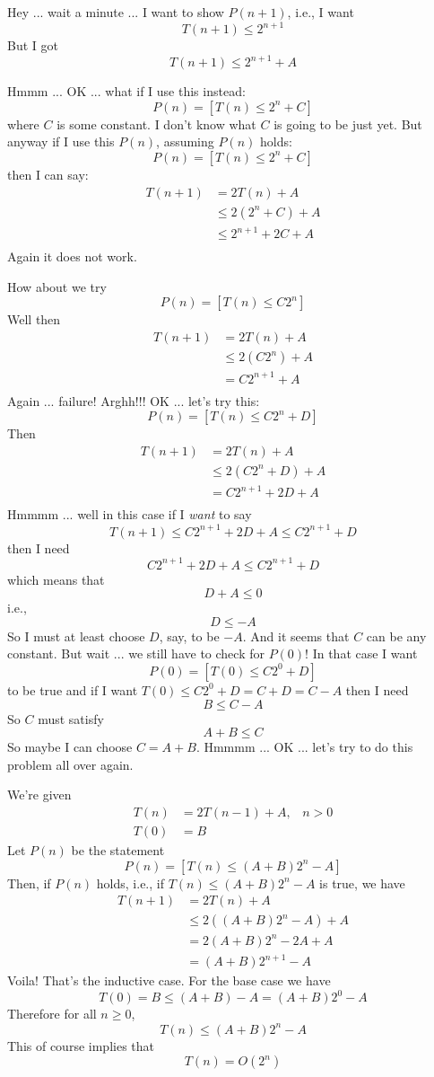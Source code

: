 Hey ... wait a minute ...
I want to show $P(n+1)$, i.e., I want
\[
T(n+1) \leq 2^{n+1}
\]
But I got
\[
T(n+1) \leq 2^{n+1} + A
\]

Hmmm ... OK ... what if I use this instead:
\[
P(n) = [T(n) \leq 2^n + C]
\]
where $C$ is some constant.
I don't know what $C$ is going to be just yet.
But anyway if I use this $P(n)$,
assuming $P(n)$ holds:
\[
P(n) = [T(n) \leq 2^n + C]
\]
then I can say:
\begin{align*}
  T(n + 1)
  &= 2 T(n) + A \\
  &\leq 2 (2^n + C) + A \\ 
  &\leq 2^{n+1} + 2C + A \\ 
\end{align*}
Again it does not work.

How about we try
\[
P(n) = [T(n) \leq C2^n]
\]
Well then
\begin{align*}
T(n+1)
&= 2T(n) + A \\
&\leq 2(C2^n) + A \\
&= C2^{n+1} + A \\
\end{align*}
Again ... failure!
Arghh!!! OK ... let's try this:
\[
P(n) = [T(n) \leq C2^n + D]
\]
Then
\begin{align*}
T(n+1)
&= 2T(n) + A \\
&\leq 2(C2^n + D) + A \\
&= C2^{n+1} + 2D + A \\
\end{align*}
Hmmmm ... well in this case if I \textit{want} to say
\[
T(n+1)
\leq C2^{n+1} + 2D + A \leq C2^{n+1} + D
\]
then I need
\[
C2^{n+1} + 2D + A \leq C2^{n+1} + D
\]
which means that
\[
D + A \leq 0
\]
i.e.,
\[
D \leq -A
\]
So I must at least choose $D$, say, to be $-A$.
And it seems that $C$ can be any constant.
But wait ... we still have to check for $P(0)$!
In that case I want
\[
P(0) = [T(0) \leq C2^0 + D]
\]
to be true
and if I want $T(0) \leq C2^0 + D = C + D = C - A$
then I need
\[
B \leq C - A
\]
So $C$ must satisfy
\[
A + B \leq C
\]
So maybe I can choose $C = A + B$.
Hmmmm ... OK ... let's try to do this problem all over again.

We're given 
\begin{align*}
T(n) &= 2 T(n-1) + A, \,\,\,\,\, n > 0 \\
T(0) &= B
\end{align*}
Let $P(n)$ be the statement
\[
P(n) = [T(n) \leq (A + B)2^n - A]
\]
Then, if $P(n)$ holds, i.e., if $T(n) \leq (A+B)2^n - A$ is true, we have
\begin{align*}
T(n+1)
&= 2T(n) + A \\
&\leq 2((A+B)2^n - A) + A \\
&= 2(A+B)2^{n} - 2A + A \\
&= (A+B)2^{n+1} - A
\end{align*}
Voila!
That's the inductive case.
For the base case we have
\[
T(0) = B \leq (A + B) - A = (A + B)2^0 - A
\]
Therefore for all $n \geq 0$,
\[
T(n) \leq (A+B)2^n - A
\]
This of course implies that
\[
T(n) = O(2^n)
\]

